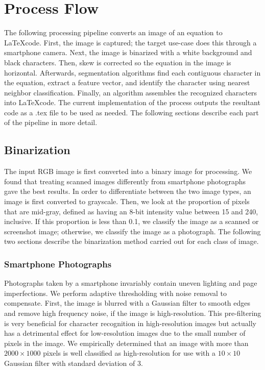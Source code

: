 \documentclass[journal]{IEEEtran}
\begin{document}
\section{Process Flow}
The following processing pipeline converts an image of an equation to \LaTeX code. First, the image is captured; the target use-case does this through a smartphone camera. Next, the image is binarized with a white background and black characters. Then, skew is corrected so the equation in the image is horizontal. Afterwards, segmentation algorithms find each contiguous character in the equation, extract a feature vector, and identify the character using nearest neighbor classification. Finally, an algorithm assembles the recognized characters into \LaTeX code. The current implementation of the process outputs the resultant code as a .tex file to be used as needed.
The following sections describe each part of the pipeline in more detail.


\subsection{Binarization}
The input RGB image is first converted into a binary image for processing. We found that treating scanned images differently from smartphone photographs gave the best results. In order to differentiate between the two image types, an image is first converted to grayscale. Then, we look at the proportion of pixels that are mid-gray, defined as having an 8-bit intensity value between 15 and 240, inclusive. If this proportion is less than 0.1, we classify the image as a scanned or screenshot image; otherwise, we classify the image as a photograph. The following two sections describe the binarization method carried out for each class of image.

\subsubsection{Smartphone Photographs}
Photographs taken by a smartphone invariably contain uneven lighting and page imperfections. We perform adaptive thresholding with noise removal to compensate. First, the image is blurred with a Gaussian filter to smooth edges and remove high frequency noise, if the image is high-resolution. This pre-filtering is very beneficial for character recognition in high-resolution images but actually has a detrimental effect for low-resolution images due to the small number of pixels in the image. We empirically determined that an image with more than $2000\times1000$ pixels is well classified as high-resolution for use with a $10\times10$ Gaussian filter with standard deviation of $3$.
\end{document}
